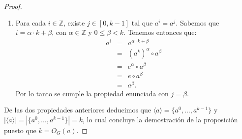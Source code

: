 \begin{proof}
\begin{enumerate}
\item
Para cada $i \in \mathbb{Z}$, existe $j \in [0,k-1]$ tal que $a^i =
a^j$. Sabemos que $i = \alpha \cdot k + \beta$, con $\alpha \in \mathbb{Z}$
y $0 \leq \beta < k$. Tenemos entonces que:
\begin{eqnarray*}
a^i & = & a^{\alpha \cdot k + \beta}\\
& = & (a^k)^{\alpha} \circ a^{\beta}\\
& = & e^{\alpha} \circ a^{\beta}\\
& = & e \circ a^{\beta}\\
& = & a^{\beta}.
\end{eqnarray*}
Por lo tanto se cumple la propiedad enunciada con $j = \beta$.
\end{enumerate}
De las dos propiedades anteriores deducimos que $\langle a \rangle
= \{a^0, \ldots, a^{k-1}\}$ y $|\langle a \rangle| = |\{a^0, \ldots,
a^{k-1}\}| = k$, lo cual concluye la demostración de la proposición
puesto que $k = O_G(a)$.
\end{proof}


